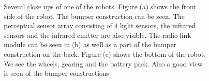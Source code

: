 \begin{figure}
\centering
{}
\caption{Several close ups of one of the robots. Figure (a) shows the front side of the robot. The bumper construction can be seen. The perceptual sensor array consisting of 4 light sensors, the infrared sensors and the infrared emitter are also visible. The radio link module can be seen in (b) as well as a part of the bumper construction on the back. Figure (c) shows the bottom of the robot. We see the wheels, gearing and the battery pack. Also a good view is seen of the bumper constructions.}
\end{figure}


